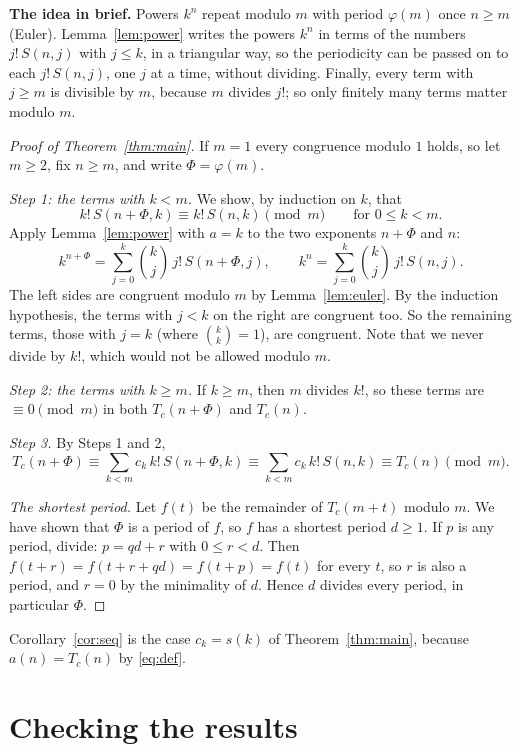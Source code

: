 \documentclass[11pt,a4paper]{article}
\theoremstyle{definition}
\theoremstyle{remark}
\newcommand{\para}[1]{\par\medskip\noindent\textbf{#1}\enspace}
\begin{document}
\para{The idea in brief.} Powers $k^n$ repeat modulo $m$ with period $\varphi(m)$ once $n\ge m$ (Euler).
Lemma~\ref{lem:power} writes the powers $k^n$ in terms of the numbers $j!\,S(n,j)$ with $j\le k$, in a triangular way, so
the periodicity can be passed on to each $j!\,S(n,j)$, one $j$ at a time, without dividing. Finally, every term with
$j\ge m$ is divisible by $m$, because $m$ divides $j!$; so only finitely many terms matter modulo $m$.

\begin{proof}[Proof of Theorem~\ref{thm:main}]
If $m=1$ every congruence modulo $1$ holds, so let $m\ge2$, fix $n\ge m$, and write $\Phi=\varphi(m)$.

\emph{Step 1: the terms with $k<m$.} We show, by induction on $k$, that
\[
k!\,S(n+\Phi,k)\equiv k!\,S(n,k)\pmod m\qquad\text{for }0\le k<m.
\]
Apply Lemma~\ref{lem:power} with $a=k$ to the two exponents $n+\Phi$ and $n$:
\[
k^{n+\Phi}=\sum_{j=0}^{k}\binom kj\,j!\,S(n+\Phi,j),\qquad
k^{n}=\sum_{j=0}^{k}\binom kj\,j!\,S(n,j).
\]
The left sides are congruent modulo $m$ by Lemma~\ref{lem:euler}. By the induction hypothesis, the terms with $j<k$ on the
right are congruent too. So the remaining terms, those with $j=k$ (where $\binom kk=1$), are congruent. Note that we never
divide by $k!$, which would not be allowed modulo $m$.

\emph{Step 2: the terms with $k\ge m$.} If $k\ge m$, then $m$ divides $k!$, so these terms are $\equiv0\pmod m$ in both
$T_c(n+\Phi)$ and $T_c(n)$.

\emph{Step 3.} By Steps 1 and 2,
\[
T_c(n+\Phi)\equiv\sum_{k<m}c_k\,k!\,S(n+\Phi,k)\equiv\sum_{k<m}c_k\,k!\,S(n,k)\equiv T_c(n)\pmod m .
\]

\emph{The shortest period.} Let $f(t)$ be the remainder of $T_c(m+t)$ modulo $m$. We have shown that $\Phi$ is a period of
$f$, so $f$ has a shortest period $d\ge1$. If $p$ is any period, divide: $p=qd+r$ with $0\le r<d$. Then
$f(t+r)=f(t+r+qd)=f(t+p)=f(t)$ for every $t$, so $r$ is also a period, and $r=0$ by the minimality of $d$. Hence $d$
divides every period, in particular $\Phi$.
\end{proof}

Corollary~\ref{cor:seq} is the case $c_k=s(k)$ of Theorem~\ref{thm:main}, because $a(n)=T_c(n)$ by \eqref{eq:def}.

\section{Checking the results}\label{sec:checks}
\end{document}
